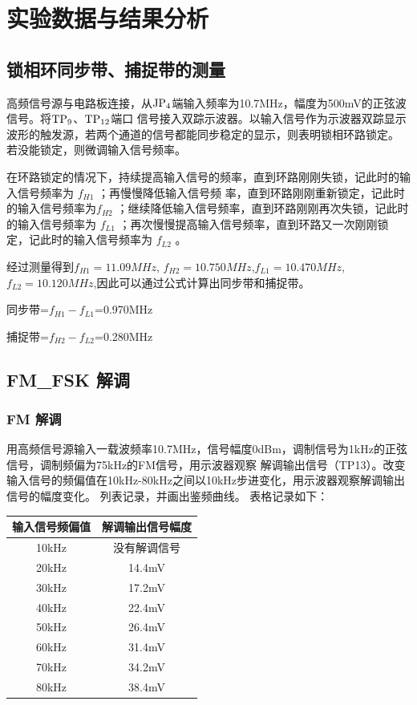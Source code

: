 \documentclass{../source/Experiment}
\begin{document}
\section{实验数据与结果分析}
\subsection{锁相环同步带、捕捉带的测量}

高频信号源与电路板连接，从$\rm JP_4$端输入频率为10.7MHz，幅度为500mV的正弦波信号。将$\rm TP_9$、$\rm TP_{12}$端口
信号接入双踪示波器。以输入信号作为示波器双踪显示波形的触发源，若两个通道的信号都能同步稳定的显示，则表明锁相环路锁定。
若没能锁定，则微调输入信号频率。

在环路锁定的情况下，持续提高输入信号的频率，直到环路刚刚失锁，记此时的输入信号频率为 $f_{H1}$ ；再慢慢降低输入信号频
率，直到环路刚刚重新锁定，记此时的输入信号频率为$f_{H2}$ ；继续降低输入信号频率，直到环路刚刚再次失锁，记此时的输入信号频率为 $f_{L1}$ ；再次慢慢提高输入信号频率，直到环路又一次刚刚锁定，记此时的输入信号频率为 $f_{L2}$ 。


经过测量得到$ f_{H1}=11.09MHz $,
$ f_{H2}=10.750MHz $,$ f_{L1}=10.470MHz $,$ f_{L2}=10.120MHz $,因此可以通过公式计算出同步带和捕捉带。

同步带=$f_{H1}-f_{L1}$=0.970MHz

捕捉带=$f_{H2}-f_{L2}$=0.280MHz

\subsection{FM\_FSK 解调 }
\subsubsection{FM 解调}

用高频信号源输入一载波频率10.7MHz，信号幅度0dBm，调制信号为1kHz的正弦信号，调制频偏为75kHz的FM信号，用示波器观察
解调输出信号（TP13）。改变输入信号的频偏值在10kHz-80kHz之间以10kHz步进变化，用示波器观察解调输出信号的幅度变化。
列表记录，并画出鉴频曲线。
表格记录如下：
\begin{table}[H]
    \centering
    \begin{tabular}{|c|c|}
        \hline
        输入信号频偏值 & 解调输出信号幅度 \\ \hline
        10kHz          & 没有解调信号     \\ \hline
        20kHz          & 14.4mV           \\ \hline
        30kHz          & 17.2mV           \\ \hline
        40kHz          & 22.4mV           \\ \hline
        50kHz          & 26.4mV           \\ \hline
        60kHz          & 31.4mV           \\ \hline
        70kHz          & 34.2mV           \\ \hline
        80kHz          & 38.4mV           \\ \hline
    \end{tabular}
\end{table}
\end{document}
